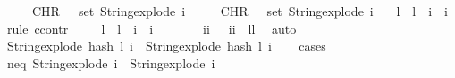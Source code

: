 \begin{isabellebody}
\ \ \ \ \ {\isachardoublequoteopen}CHR\ {\isacharprime}{\kern0pt}{\isacharprime}{\kern0pt}{\isachardot}{\kern0pt}{\isacharprime}{\kern0pt}{\isacharprime}{\kern0pt}\ {\isasymnotin}\ set\ {\isacharparenleft}{\kern0pt}String{\isachardot}{\kern0pt}explode\ i{\isacharparenright}{\kern0pt}{\isachardoublequoteclose}\isanewline
\ \ \ \ \ {\isachardoublequoteopen}CHR\ {\isacharprime}{\kern0pt}{\isacharprime}{\kern0pt}{\isachardot}{\kern0pt}{\isacharprime}{\kern0pt}{\isacharprime}{\kern0pt}\ {\isasymnotin}\ set\ {\isacharparenleft}{\kern0pt}String{\isachardot}{\kern0pt}explode\ i{\isacharprime}{\kern0pt}{\isacharparenright}{\kern0pt}{\isachardoublequoteclose}\isanewline
\ \ \ {\isachardoublequoteopen}l\ {\isacharequal}{\kern0pt}\ l{\isacharprime}{\kern0pt}\ {\isasymand}\ i\ {\isacharequal}{\kern0pt}\ i{\isacharprime}{\kern0pt}{\isachardoublequoteclose}\isanewline
%
\isadelimproof
%
\endisadelimproof
%
\isatagproof
{}\isamarkupfalse%
\ {\isacharparenleft}{\kern0pt}rule\ ccontr{\isacharparenright}{\kern0pt}\isanewline
\ \ \isamarkupfalse%
\ {\isachardoublequoteopen}{\isasymnot}\ {\isacharparenleft}{\kern0pt}l\ {\isacharequal}{\kern0pt}\ l{\isacharprime}{\kern0pt}\ {\isasymand}\ i\ {\isacharequal}{\kern0pt}\ i{\isacharprime}{\kern0pt}{\isacharparenright}{\kern0pt}{\isachardoublequoteclose}\ \isanewline
\ \ \isamarkupfalse%
\ \isamarkupfalse%
\ {\isacharparenleft}{\kern0pt}{}{\isacharparenright}{\kern0pt}\ {\isachardoublequoteopen}i{\isasymnoteq}i{\isacharprime}{\kern0pt}{\isachardoublequoteclose}\ {\isacharbar}{\kern0pt}\ {\isacharparenleft}{\kern0pt}{}{\isacharparenright}{\kern0pt}\ {\isachardoublequoteopen}i{\isacharequal}{\kern0pt}i{\isacharprime}{\kern0pt}\ {\isasymand}\ l{\isasymnoteq}l{\isacharprime}{\kern0pt}{\isachardoublequoteclose}\ \isamarkupfalse%
\ auto\isanewline
\ \ \isamarkupfalse%
\ \isamarkupfalse%
\ {\isachardoublequoteopen}String{\isachardot}{\kern0pt}explode\ {\isacharparenleft}{\kern0pt}hash\ l\ i{\isacharparenright}{\kern0pt}\ {\isasymnoteq}\ String{\isachardot}{\kern0pt}explode\ {\isacharparenleft}{\kern0pt}hash\ l{\isacharprime}{\kern0pt}\ i{\isacharprime}{\kern0pt}{\isacharparenright}{\kern0pt}{\isachardoublequoteclose}\isanewline
\ \ \isamarkupfalse%
\ cases\isanewline
\ \ \ \ \isamarkupfalse%
\ {}\isanewline
\ \ \ \ \isamarkupfalse%
\ \isamarkupfalse%
\ neq{\isacharcolon}{\kern0pt}\ {\isachardoublequoteopen}{\isacharparenleft}{\kern0pt}String{\isachardot}{\kern0pt}explode\ i{\isacharparenright}{\kern0pt}\ {\isasymnoteq}\ {\isacharparenleft}{\kern0pt}String{\isachardot}{\kern0pt}explode\ i{\isacharprime}{\kern0pt}{\isacharparenright}{\kern0pt}{\isachardoublequoteclose}\ \isamarkupfalse%

\end{isabellebody}
